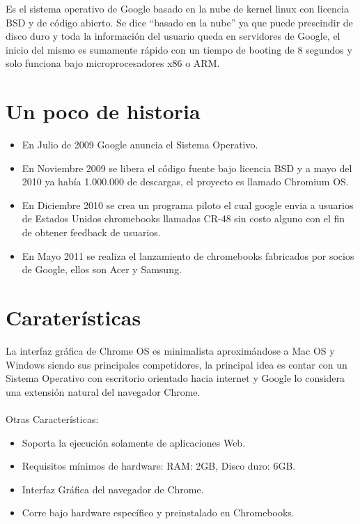 Es el sistema operativo de Google basado en la nube de kernel linux con licencia BSD y de c\'odigo abierto. Se dice ``basado en la nube'' ya que puede prescindir de disco duro y toda la informaci\'on del usuario queda en servidores de Google, el inicio del mismo es sumamente r\'apido con un tiempo de booting de 8 segundos y solo funciona bajo microprocesadores x86 o ARM.

\section{Un poco de historia}

\begin{itemize}
     \item En Julio de 2009 Google anuncia el Sistema Operativo.
     \item En Noviembre 2009 se libera el código fuente bajo licencia BSD y a mayo del 2010 ya hab\'ia 1.000.000 de descargas, el proyecto es llamado Chromium OS. 
     \item En Diciembre 2010 se crea un programa piloto el cual google envia a usuarios de Estados Unidos chromebooks llamadas CR-48 sin costo alguno con el fin de obtener feedback de usuarios.
     \item En Mayo 2011 se realiza el lanzamiento de chromebooks fabricados por socios de Google, ellos son Acer y Samsung.
\end{itemize}

\section{Carater\'isticas}

La interfaz gr\'afica de Chrome OS es minimalista aproxim\'andose a Mac OS y Windows siendo sus principales competidores, la principal idea es contar con un Sistema Operativo con escritorio orientado hacia internet y Google lo considera una extensión natural del navegador Chrome.
\\
\\
Otras Caracter\'isticas:

\begin{itemize}
     \item Soporta la ejecuci\'on solamente de aplicaciones Web.
     \item Requisitos mínimos de hardware: RAM: 2GB, Disco duro: 6GB.
     \item Interfaz Gr\'afica del navegador de Chrome.
	 \item Corre bajo hardware específico y preinstalado en Chromebooks.
\end{itemize}

